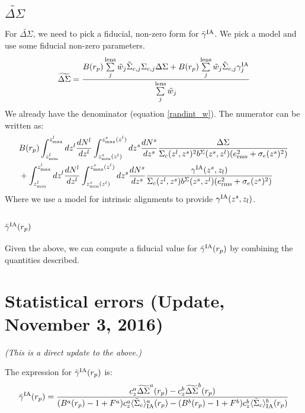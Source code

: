 \documentclass[onecolumn,amsmath,aps,fleqn, superscriptaddress]{revtex4}
\begin{document}
\subsection*{$\widetilde{\Delta \Sigma}$}

For $\widetilde{\Delta \Sigma}$, we need to pick a fiducial, non-zero form for $\bar{\gamma}^{\rm IA}$. We pick a model and use some fiducial non-zero parameters.
\begin{equation}
\widetilde{\Delta \Sigma}= \frac{B(r_p) \sum\limits_{j}^{\rm lens} \tilde{w}_j \tilde{\Sigma}_{c,j} \Sigma_{c,j} \Delta \Sigma + B(r_p) \sum\limits_{j}^{\rm lens} \tilde{w}_j \tilde{\Sigma}_{c,j} \gamma^{\rm IA}_j }{\sum\limits_{j}^{\rm lens} \tilde{w}_j}
\label{deltasigma}
\end{equation}
We already have the denominator (equation \ref{randint_w}). The numerator can be written as:
\begin{align}
&B(r_p)\int_{z^l_{\rm min}}^{z^l_{\rm max}}dz^l \frac{dN^l}{dz^l} \int_{z^s_{\rm min}(z^l)}^{z^s_{\rm max}(z^l)}dz^s \frac{dN^s}{dz^s} \frac{\Delta \Sigma}{\Sigma_c(z^l , z^s)^2 b^{\Sigma}(z^s,z^l) (e_{\rm rms}^2 + \sigma_e(z^s)^2)} \nonumber \\ &+\int_{z^l_{\rm min}}^{z^l_{\rm max}}dz^l \frac{dN^l}{dz^l} \int_{z^s_{\rm min}(z^l)}^{z^s_{\rm max}(z^l)}dz^s \frac{dN^s}{dz^s} \frac{\gamma^{\rm IA}(z^s, z_l)}{\Sigma_c(z^l , z^s) b^{\Sigma}(z^s,z^l) (e_{\rm rms}^2 + \sigma_e(z^s)^2)} 
\label{numdeltasigma}
\end{align}
Where we use a model for intrinsic alignments to provide $\gamma^{\rm IA}(z^s, z_l)$.

\subsection*{$\bar{\gamma}^{\rm IA}(r_p)$}
Given the above, we can compute a fiducial value for $\bar{\gamma}^{\rm IA}(r_p)$ by combining the quantities described.

\section{Statistical errors (Update, November 3, 2016)}

{\it (This is a direct update to the above.)}

The expression for $\bar{\gamma}^{\rm IA}(r_p)$ is:
\begin{equation}
\bar{\gamma}^{\rm IA}(r_p) = \frac{c_z^a \widetilde{\Delta\Sigma}^a(r_p) - c_z^b \widetilde{\Delta\Sigma}^b(r_p)}{(B^a(r_p)-1+F^a)c_z^a \langle \tilde{\Sigma}_c\rangle_{\rm IA}^a(r_p) -(B^b(r_p)-1+F^b)c_z^b \langle \tilde{\Sigma}_c\rangle_{\rm IA}^b(r_p)}
\label{gamma_sol_oct26}
\end{equation}
\end{document}
